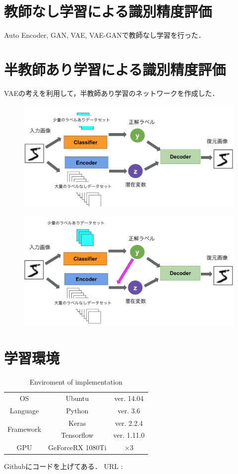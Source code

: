 \section{教師なし学習による識別精度評価}
Auto Encoder, GAN, VAE, VAE-GANで教師なし学習を行った．

\section{半教師あり学習による識別精度評価}
VAEの考えを利用して，半教師あり学習のネットワークを作成した．
\begin{figure}[H]
	\centering
	\includegraphics[width=0.7\linewidth]{fig/chapter3/networks/patern_A}
	\caption{}
	\label{fig:paterna}
\end{figure}

\begin{figure}[H]
	\centering
	\includegraphics[width=0.7\linewidth]{fig/chapter3/networks/patern_B}
	\caption{}
	\label{fig:paterna}
\end{figure}


\section{学習環境}
\begin{table}[H]
	\centering
	\caption{Enviroment of implementation}
	\label{tab:環境}
	\begin{tabular}{ccc}\toprule
		OS & Ubuntu & ver. 14.04 \\ 
		Language & Python & ver. 3.6 \\ 
		\multirow{2}{*}{Framework} & Keras & ver. 2.2.4 \\ 
		& Tensorflow & ver. 1.11.0 \\ 
		GPU & GeForceRX 1080Ti & $\times$3 \\  \bottomrule
	\end{tabular}
\end{table}

Githubにコードを上げてある．
URL : 
